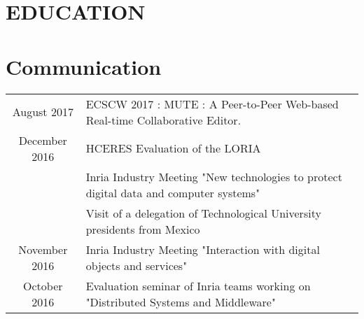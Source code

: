 \documentclass[]{deedy-resume-openfont}
\begin{document}
\section{EDUCATION}

\descript{}
\sectionsep


\section{Communication}

\descript{}
\vspace{5pt}
\begin{tabular}{cp{150mm}}
August 2017         & ECSCW 2017 : MUTE : A Peer-to-Peer Web-based Real-time Collaborative Editor.\\
December 2016       & HCERES Evaluation of the LORIA\\
                    & Inria Industry Meeting "New technologies to protect digital data and computer systems"\\
                    & Visit of a delegation of Technological University presidents from Mexico\\
November 2016       & Inria Industry Meeting "Interaction with digital objects and services"\\
October 2016        & Evaluation seminar of Inria teams working on "Distributed Systems and Middleware"\\
\end{tabular}
\sectionsep

\hfill
\end{document}
